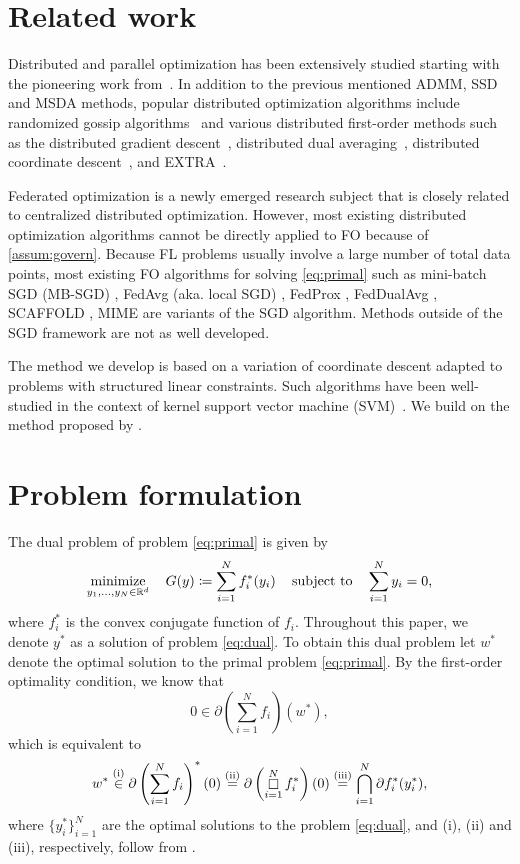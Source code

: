 \section{Related work}
\label{sec:relatedWork}

Distributed and parallel optimization has been extensively studied starting with the pioneering work from~\citet{Bertsekas89}. In addition to the previous mentioned ADMM, SSD and MSDA methods, popular distributed optimization algorithms include randomized gossip algorithms~\citep{BoydGPS06} and various distributed first-order methods such as the distributed gradient descent~\citep{NedicO09}, distributed dual averaging~\citep{DuchiAW12}, distributed coordinate descent~\citep{RichtarikT16}, and EXTRA~\citep{ShiLWY15}.

Federated optimization \citep{wang2021field} is a newly emerged research subject that is closely related to centralized distributed optimization. However, most existing distributed optimization algorithms cannot be directly applied to FO because of \autoref{assum:govern}. Because FL problems usually involve a large number of total data points, most existing FO algorithms for solving \eqref{eq:primal} such as mini-batch SGD (MB-SGD) \citep{WoodworthPS20}, FedAvg (aka. local SGD) \citep{McMahan17}, FedProx \citep{li2018federated}, FedDualAvg \citep{yuan2021federated},  SCAFFOLD \citep{pmlr-v119-karimireddy20a}, MIME \citep{karimireddy2020mime} are variants of the SGD algorithm. Methods outside of the SGD framework are not as well developed. 

The method we develop is based on a variation of coordinate descent adapted to problems with structured linear constraints. Such algorithms have been well-studied in the context of kernel support vector machine (SVM)~\citep{lut93,platt1998sequential,libsvm}. We build on the method proposed by \citet{necoara2017random}.

\section{Problem formulation}
\label{sec:problem}

The dual problem of problem \eqref{eq:primal} is given by 
\begin{equation} \label{eq:dual}
  \displaystyle\mathop{\hbox{\rm minimize}}_{y_1, \dots, y_N \in \mathbb{R}^d}\enspace\enspace G(y) \coloneqq \sum_{i=1}^N f_i^*(y_i) \enspace\enspace\mathop{\hbox{\rm subject to}}\enspace\enspace \sum_{i=1}^N y_i = 0, 
\end{equation}
where $f_i^*$ is the convex conjugate function of $f_i$. Throughout this paper, we denote $y^*$ as a solution of problem \eqref{eq:dual}. To obtain this dual problem let $w^*$ denote the optimal solution to the primal problem \eqref{eq:primal}. By the first-order optimality condition, we know that 
\[0 \in \partial\left(\sum_{i = 1}^N f_i\right)(w^*),\]
which is equivalent to 
\[w^* \overset{\rm{(i)}}{\in} \partial\left(\sum_{i = 1}^N f_i\right)^*(0) \overset{\rm{(ii)}}{=} \partial\left(\mathop\square_{i=1}^N f_i^*\right)(0) \overset{\rm{(iii)}}{=} \bigcap_{i=1}^N \partial f_i^*(y_i^*),\]
where $\{y_i^*\}_{i=1}^N$ are the optimal solutions to the problem \eqref{eq:dual}, and (i), (ii) and (iii), respectively, follow from  \citet[Proposition~E.1.4.3, Proposition~E.2.3.2 and Corollary~D.4.5.5]{hiriart-urruty01}.

